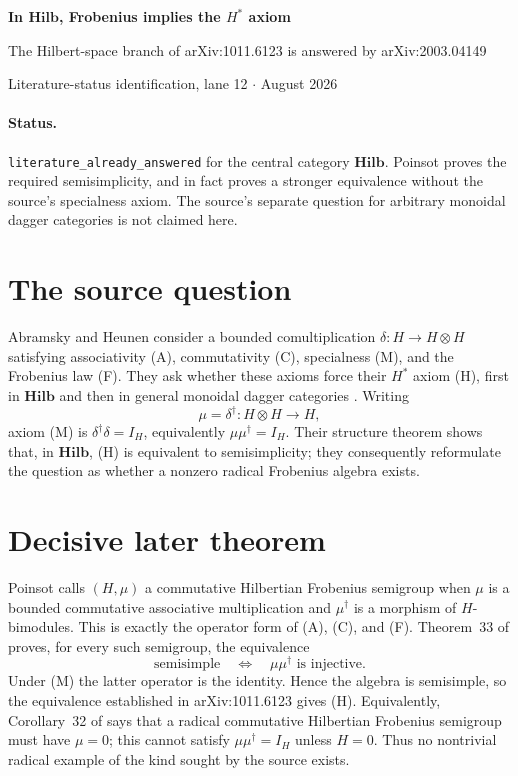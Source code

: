 \documentclass[10pt]{article}
\newcommand{\Hilb}{\mathbf{Hilb}}
\begin{document}
\begin{center}
{\LARGE\bfseries In $\Hilb$, Frobenius implies the $H^*$ axiom}\par
\vspace{0.25em}
{\large The Hilbert-space branch of arXiv:1011.6123 is answered by arXiv:2003.04149}\par
\vspace{0.65em}
Literature-status identification, lane 12 \quad $\cdot$  August 2026
\end{center}
\vspace{0.4em}

\paragraph{Status.}
\texttt{literature\_already\_answered} for the central category $\Hilb$.
Poinsot proves the required semisimplicity, and in fact proves a stronger
equivalence without the source's specialness axiom.  The source's separate
question for arbitrary monoidal dagger categories is not claimed here.

\section*{The source question}

Abramsky and Heunen consider a bounded comultiplication
$\delta:H\to H\otimes H$ satisfying associativity (A), commutativity (C),
specialness (M), and the Frobenius law (F).  They ask whether these axioms
force their $H^*$ axiom (H), first in $\Hilb$ and then in general monoidal
dagger categories \cite{AH}.  Writing
\[
  \mu=\delta^\dagger:H\otimes H\longrightarrow H,
\]
axiom (M) is $\delta^\dagger\delta=I_H$, equivalently
$\mu\mu^\dagger=I_H$.  Their structure theorem shows that, in $\Hilb$, (H)
is equivalent to semisimplicity; they consequently reformulate the question
as whether a nonzero radical Frobenius algebra exists.

\section*{Decisive later theorem}

Poinsot calls $(H,\mu)$ a commutative Hilbertian Frobenius semigroup when
$\mu$ is a bounded commutative associative multiplication and $\mu^\dagger$
is a morphism of $H$-bimodules.  This is exactly the operator form of (A),
(C), and (F).  Theorem~33 of \cite{P} proves, for every such semigroup, the
equivalence
\[
 \text{semisimple}
 \quad\Longleftrightarrow\quad
 \mu\mu^\dagger\text{ is injective}.
\]
Under (M) the latter operator is the identity.  Hence the algebra is
semisimple, so the equivalence established in arXiv:1011.6123 gives (H).
Equivalently, Corollary~32 of \cite{P} says that a radical commutative
Hilbertian Frobenius semigroup must have $\mu=0$; this cannot satisfy
$\mu\mu^\dagger=I_H$ unless $H=0$.  Thus no nontrivial radical example of
the kind sought by the source exists.
\end{document}
